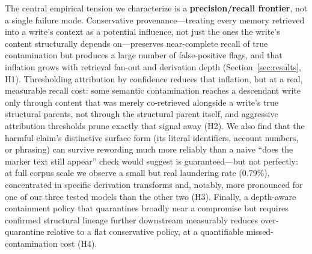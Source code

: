 The central empirical tension we characterize is a
\textbf{precision/recall frontier}, not a single failure mode. Conservative
provenance---treating every memory retrieved into a write's context as a
potential influence, not just the ones the write's content structurally
depends on---preserves near-complete recall of true contamination but
produces a large number of false-positive flags, and that inflation
grows with retrieval fan-out and derivation depth (Section~\ref{sec:results},
H1). Thresholding attribution by confidence reduces that inflation, but
at a real, measurable recall cost: some semantic contamination reaches
a descendant write only through content that was merely co-retrieved
alongside a write's true structural parents, not through the structural
parent itself, and aggressive attribution thresholds prune exactly that
signal away (H2). We also find that the harmful claim's distinctive
surface form (its literal identifiers, account numbers, or phrasing)
can survive rewording much more reliably than a naive ``does the marker
text still appear'' check would suggest is guaranteed---but not
perfectly: at full corpus scale we observe a small but real laundering
rate (0.79\%), concentrated in specific derivation transforms and,
notably, more pronounced for one of our three tested models than the
other two (H3). Finally, a depth-aware containment policy that
quarantines broadly near a compromise but requires confirmed structural
lineage further downstream measurably reduces over-quarantine relative
to a flat conservative policy, at a quantifiable missed-contamination
cost (H4).

